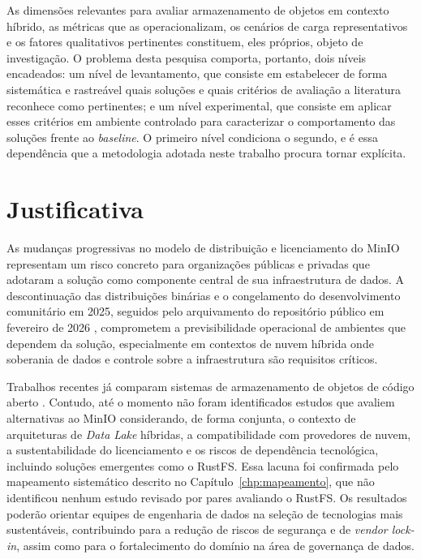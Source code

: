 As dimensões relevantes para avaliar armazenamento de objetos em contexto híbrido,
as métricas que as operacionalizam, os cenários de carga representativos e os
fatores qualitativos pertinentes constituem, eles próprios, objeto de investigação.
O problema desta pesquisa comporta, portanto, dois níveis encadeados: um nível de
levantamento, que consiste em estabelecer de forma sistemática e rastreável quais
soluções e quais critérios de avaliação a literatura reconhece como pertinentes; e
um nível experimental, que consiste em aplicar esses critérios em ambiente
controlado para caracterizar o comportamento das soluções frente ao \textit{baseline}.
O primeiro nível condiciona o segundo, e é essa dependência que a metodologia
adotada neste trabalho procura tornar explícita.

\section{Justificativa}

As mudanças progressivas no modelo de distribuição e licenciamento do MinIO
representam um risco concreto para organizações públicas e privadas que adotaram
a solução como componente central de sua infraestrutura de dados. A descontinuação
das distribuições binárias e o congelamento do desenvolvimento comunitário em 2025,
seguidos pelo arquivamento do repositório público em fevereiro de 2026
\citep{faun2026,minio2026repo}, comprometem a previsibilidade operacional de
ambientes que dependem da solução, especialmente em contextos de nuvem híbrida onde
soberania de dados e controle sobre a infraestrutura são requisitos críticos.

Trabalhos recentes já comparam sistemas de armazenamento de objetos de código
aberto \citep{tast2026comparative}. Contudo, até o momento não foram identificados
estudos que avaliem alternativas ao MinIO considerando, de forma conjunta, o
contexto de arquiteturas de \textit{Data Lake} híbridas, a compatibilidade com
provedores de nuvem, a sustentabilidade do licenciamento e os riscos de dependência
tecnológica, incluindo soluções emergentes como o RustFS. Essa lacuna foi
confirmada pelo mapeamento sistemático descrito no
Capítulo~\ref{chp:mapeamento}, que não identificou nenhum estudo revisado por
pares avaliando o RustFS. Os resultados poderão orientar equipes de
engenharia de dados na seleção de tecnologias mais sustentáveis, contribuindo para
a redução de riscos de segurança e de \textit{vendor lock-in}, assim como para o
fortalecimento do domínio na área de governança de dados.

